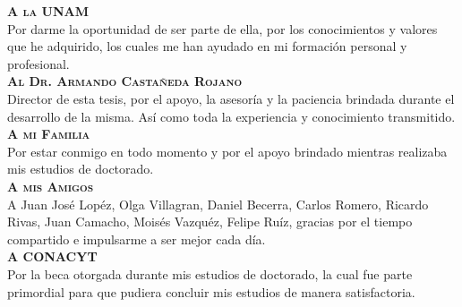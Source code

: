 \begin{agradecimientos}
  \textbf{\textsc{A la UNAM}}\\

  Por darme la oportunidad de ser parte de ella, por los conocimientos
  y valores que he adquirido, los cuales me han ayudado en mi
  formación personal y profesional.\\

  \textbf{\textsc{Al Dr. Armando Castañeda Rojano}}\\

  Director de esta tesis, por el apoyo, la asesoría y la paciencia
  brindada durante el desarrollo de la misma. Así como toda la
  experiencia y conocimiento transmitido.\\

  \textbf{\textsc{A mi Familia}}\\

  Por estar conmigo en todo momento y por el apoyo brindado mientras
  realizaba mis estudios de doctorado.\\

  \textbf{\textsc{A mis Amigos}}\\

  A Juan José Lopéz, Olga Villagran, Daniel Becerra, Carlos Romero,
  Ricardo Rivas, Juan Camacho, Moisés Vazquéz, Felipe Ruíz, gracias
  por el tiempo compartido e impulsarme a ser mejor cada día.\\

  \textbf{\textsc{A CONACYT}}\\

  Por la beca otorgada durante mis estudios de doctorado, la cual fue
  parte primordial para que pudiera concluir mis estudios de manera
  satisfactoria.\\
\end{agradecimientos}